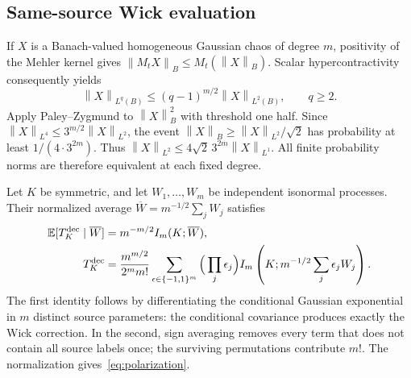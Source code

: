 \documentclass[11pt,a4paper]{amsart}
\numberwithin{equation}{section}
\theoremstyle{definition}
\theoremstyle{remark}
\newcommand{\E}{\mathbb E}
\newcommand{\norm}[1]{\left\lVert#1\right\rVert}
\begin{document}
\subsection{Same-source Wick evaluation}
If $X$ is a Banach-valued homogeneous Gaussian chaos of degree $m$, positivity of the Mehler kernel gives $\norm{M_tX}_B\le M_t(\norm X_B)$. Scalar hypercontractivity~\cite{Janson,Maas} consequently yields
\begin{equation}\label{eq:hyper}
 \norm X_{L^q(B)}\le(q-1)^{m/2}\norm X_{L^2(B)},\qquad q\ge2.
\end{equation}
Apply Paley--Zygmund to $\norm X_B^2$ with threshold one half. Since $\norm X_{L^4}\le3^{m/2}\norm X_{L^2}$, the event
$\norm X_B\ge\norm X_{L^2}/\sqrt2$ has probability at least $1/(4\cdot3^{2m})$. Thus
$\norm X_{L^2}\le4\sqrt2\,3^{2m}\norm X_{L^1}$.
All finite probability norms are therefore equivalent at each fixed degree.

Let $K$ be symmetric, and let $W_1,\ldots,W_m$ be independent isonormal processes. Their normalized average $\overline W=m^{-1/2}\sum_jW_j$ satisfies
\begin{align}
 \E[T_K^{\rm dec}\mid\overline W]
 &=m^{-m/2}I_m(K;\overline W),\label{eq:regression}\\
 T_K^{\rm dec}
 &=\frac{m^{m/2}}{2^mm!}\sum_{\epsilon\in\{-1,1\}^m}
       \Big(\prod_j\epsilon_j\Big)
 I_m\left(K;m^{-1/2}\sum_j\epsilon_jW_j\right).\label{eq:polarization}
\end{align}
The first identity follows by differentiating the conditional Gaussian exponential in $m$ distinct source parameters: the conditional covariance produces exactly the Wick correction. In the second, sign averaging removes every term that does not contain all source labels once; the surviving permutations contribute $m!$. The normalization gives~\eqref{eq:polarization}.
\end{document}
